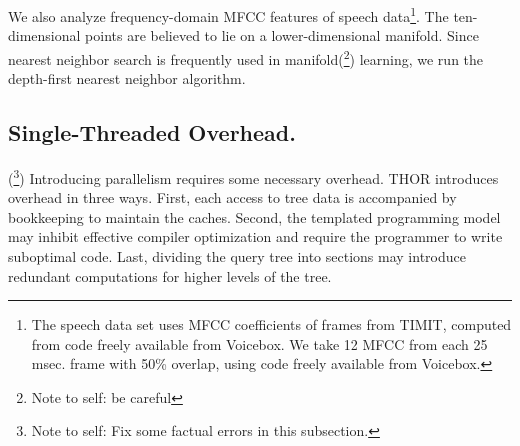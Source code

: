 \documentclass[twoside,leqno,twocolumn]{article}
\newcommand{\authornote}[1]{(\footnote{Note to self: #1})}
\newcommand{\authorsnote}[1]{\authornote{#1}}
\newcommand{\mysub}[1]{\subsection{#1.}}
\begin{document}
We also analyze frequency-domain MFCC features of speech data\footnote{The speech data set uses MFCC coefficients of frames from TIMIT, computed from code freely available from Voicebox.
   We take 12 MFCC from each 25 msec. frame with 50\% overlap, using code freely available from Voicebox.}.
The ten-dimensional points are believed to lie on a lower-dimensional manifold.
Since nearest neighbor search is frequently used in manifold\authorsnote{be careful} learning, we run the depth-first nearest neighbor algorithm.



\mysub{Single-Threaded Overhead}

\authorsnote{Fix some factual errors in this subsection.}
Introducing parallelism requires some necessary overhead.
THOR introduces overhead in three ways.
First, each access to tree data is accompanied by bookkeeping to maintain the caches.
Second, the templated programming model may inhibit effective compiler optimization and require the programmer to write suboptimal code.
Last, dividing the query tree into sections may introduce redundant computations for higher levels of the tree.
\end{document}
